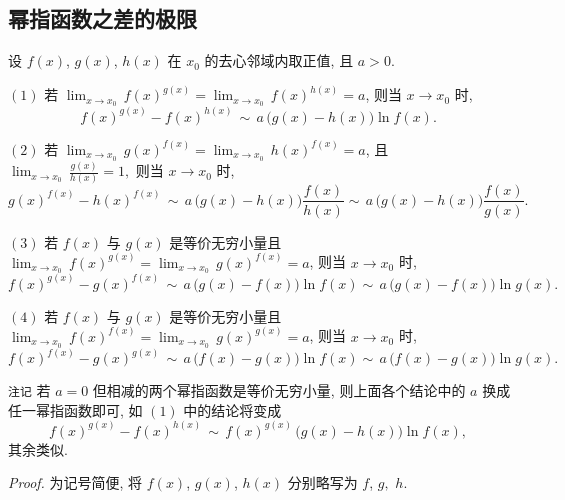 

\subsection{幂指函数之差的极限}
\begin{theorem}{}
设 $f(x)$, $g(x)$, $h(x)$ 在 $x_{0}$ 的去心邻域内取正值,
且 $a>0$. 

$(1)$ 若 ${\displaystyle \lim_{x\to x_{0}}}\,f(x)^{g(x)}={\displaystyle \lim_{x\to x_{0}}}\,f(x)^{h(x)}=a$,
则当 $x\to x_{0}$ 时, 
$$
f(x)^{g(x)}-f(x)^{h(x)}\,\sim\,a\,\big(g(x)-h(x)\big)\ln f(x).~
$$
 

$(2)$ 若 ${\displaystyle {\displaystyle \lim_{x\to x_{0}}}\,}g(x)^{f(x)}={\displaystyle \lim_{x\to x_{0}}}\,h(x)^{f(x)}=a$,
且 ${\displaystyle \lim_{x\to x_{0}}}\,{\displaystyle \frac{g(x)}{h(x)}}=1,$
则当 $x\to x_{0}$ 时, 
\[
g(x)^{f(x)}-h(x)^{f(x)}\,\sim\,a\,\big(g(x)-h(x)\big)\frac{f(x)}{h(x)}\sim\,a\,\big(g(x)-h(x)\big)\frac{f(x)}{g(x)}.~
\]

$(3)$ 若 $f(x)$ 与 $g(x)$ 是等价无穷小量且 ${\displaystyle {\displaystyle \lim_{x\to x_{0}}}\,}f(x)^{g(x)}={\displaystyle \lim_{x\to x_{0}}}\,g(x)^{f(x)}=a$,
则当 $x\to x_{0}$ 时, 
\[
f(x)^{g(x)}-g(x)^{f(x)}\,\sim\,a\,\big(g(x)-f(x)\big)\ln f(x)\sim\,a\,\big(g(x)-f(x)\big)\ln g(x).~
\]

$(4)$ 若 $f(x)$ 与 $g(x)$ 是等价无穷小量且 ${\displaystyle {\displaystyle \lim_{x\to x_{0}}}\,}f(x)^{f(x)}={\displaystyle \lim_{x\to x_{0}}}\,g(x)^{g(x)}=a$,
则当 $x\to x_{0}$ 时, 
\[
f(x)^{f(x)}-g(x)^{g(x)}\,\sim\,a\,\big(f(x)-g(x)\big)\ln f(x)\sim\,a\,\big(f(x)-g(x)\big)\ln g(x).~
\]

\verb`注记`
若 $a=0$ 但相减的两个幂指函数是等价无穷小量, 则上面各个结论中的 $a$ 换成任一幂指函数即可, 如 $(1)$ 中的结论将变成
\[
f(x)^{g(x)}-f(x)^{h(x)}\,\sim\,f(x)^{g(x)}\,\big(g(x)-h(x)\big)\ln f(x),~
\]
其余类似. 

\end{theorem}


\textsl{Proof.} 为记号简便, 将 $f(x)$, $g(x)$, $h(x)$ 分别略写为 $f$, $g,$ $h$. 

